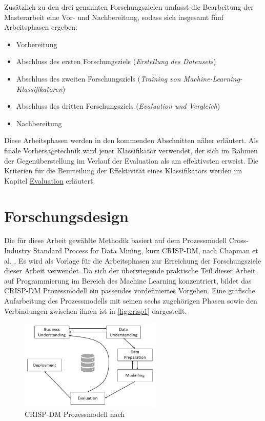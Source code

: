 \label{phases_definition}

Zusätzlich zu den drei genannten Forschungszielen umfasst die Bearbeitung der Masterarbeit eine Vor- und Nachbereitung, sodass sich insgesamt fünf Arbeitsphasen ergeben:

\begin{itemize}
\setlength{\itemsep}{-2pt}
\item Vorbereitung
\item Abschluss des ersten Forschungsziels (\textit{Erstellung des Datensets})
\item Abschluss des zweiten Forschungsziels (\textit{Training von Machine-Learning-Klassifikatoren})
\item Abschluss des dritten Forschungsziels (\textit{Evaluation und Vergleich})
\item Nachbereitung
\end{itemize}

Diese Arbeitsphasen werden in den kommenden Abschnitten näher erläutert. Als finale Vorhersagetechnik wird jener Klassifikator verwendet, der sich im Rahmen der Gegenüberstellung im Verlauf der Evaluation als am \glqq effektivsten\grqq{} erweist. Die Kriterien für die Beurteilung der Effektivität eines Klassifikators werden im Kapitel \glqq \hyperref[evaluation]{Evaluation}\grqq{} erläutert.

\section{Forschungsdesign}

Die für diese Arbeit gewählte Methodik basiert auf dem Prozessmodell \glqq Cross-Industry Standard Process for Data Mining\grqq, kurz CRISP-DM, nach Chapman et al. \cite{Chapman2000}. Es wird als Vorlage für die Arbeitsphasen zur Erreichung der Forschungsziele dieser Arbeit verwendet. Da sich der überwiegende praktische Teil dieser Arbeit auf Programmierung im Bereich des Machine Learning konzentriert, bildet das CRISP-DM Prozessmodell ein passendes vordefiniertes Vorgehen. Eine grafische Aufarbeitung des Prozessmodells mit seinen sechs zugehörigen Phasen sowie den Verbindungen zwischen ihnen ist in \autoref{fig:crisp1} dargestellt. 

\begin{figure}[t]
    \centering
    \includegraphics[width=0.6\textwidth]{images/CRISP-DM1}
    \caption{CRISP-DM Prozessmodell nach \cite{Chapman2000}}\label{fig:crisp1}
\end{figure}

